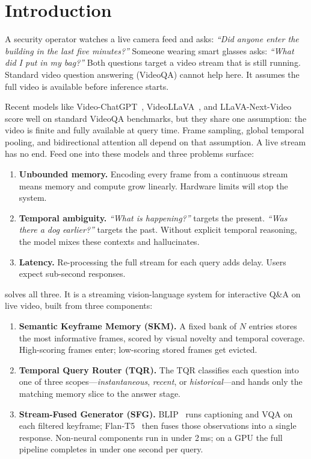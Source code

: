 \section{Introduction}
\label{sec:intro}

A security operator watches a live camera feed and asks: \emph{``Did anyone enter the building in the last five minutes?''}
Someone wearing smart glasses asks: \emph{``What did I put in my bag?''}
Both questions target a video stream that is still running. Standard video question answering (VideoQA) cannot help here. It assumes the full video is available before inference starts.

Recent models like Video-ChatGPT~\cite{maaz2023videochatgpt}, VideoLLaVA~\cite{lin2023videollava}, and LLaVA-Next-Video~\cite{zhang2024llavanextvideo} score well on standard VideoQA benchmarks, but they share one assumption: the video is finite and fully available at query time.
Frame sampling, global temporal pooling, and bidirectional attention all depend on that assumption.
A live stream has no end. Feed one into these models and three problems surface:

\begin{enumerate}[leftmargin=*,itemsep=2pt]
    \item \textbf{Unbounded memory.} Encoding every frame from a continuous stream means memory and compute grow linearly. Hardware limits will stop the system.
    \item \textbf{Temporal ambiguity.} \emph{``What is happening?''} targets the present. \emph{``Was there a dog earlier?''} targets the past. Without explicit temporal reasoning, the model mixes these contexts and hallucinates.
    \item \textbf{Latency.} Re-processing the full stream for each query adds delay. Users expect sub-second responses.
\end{enumerate}

\textbf{\ours} solves all three. It is a streaming vision-language system for interactive Q\&A on live video, built from three components:

\begin{enumerate}[leftmargin=*,itemsep=2pt]
    \item \textbf{Semantic Keyframe Memory (SKM).}
    A fixed bank of $N$ entries stores the most informative frames, scored by visual novelty and temporal coverage. High-scoring frames enter; low-scoring stored frames get evicted.

    \item \textbf{Temporal Query Router (TQR).}
    The TQR classifies each question into one of three scopes---\emph{instantaneous}, \emph{recent}, or \emph{historical}---and hands only the matching memory slice to the answer stage.

    \item \textbf{Stream-Fused Generator (SFG).}
    BLIP~\cite{li2022blip} runs captioning and VQA on each filtered keyframe; Flan-T5~\cite{chung2022flanT5} then fuses those observations into a single response.
    Non-neural components run in under 2\,ms; on a GPU the full pipeline completes in under one second per query.
\end{enumerate}

